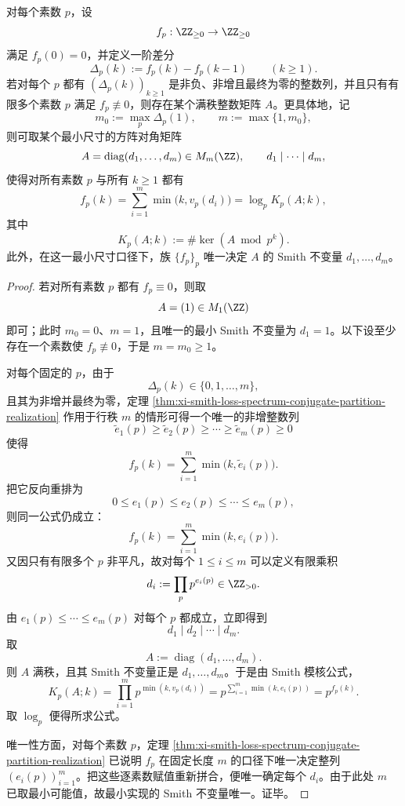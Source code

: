 \begin{theorem}\label{thm:xi-time-part62de-smith-profile-global-realization}
对每个素数 \(p\)，设
\[
f_p:\ZZ_{\ge 0}\to \ZZ_{\ge 0}
\]
满足 \(f_p(0)=0\)，并定义一阶差分
\[
\Delta_p(k):=f_p(k)-f_p(k-1)
\qquad (k\ge 1).
\]
若对每个 \(p\) 都有 \((\Delta_p(k))_{k\ge 1}\) 是非负、非增且最终为零的整数列，并且只有有限多个素数 \(p\) 满足 \(f_p\not\equiv 0\)，则存在某个满秩整数矩阵 \(A\)。更具体地，记
\[
m_0:=\max_{p}\Delta_p(1),
\qquad
m:=\max\{1,m_0\},
\]
则可取某个最小尺寸的方阵对角矩阵
\[
A=\operatorname{diag}(d_1,\dots,d_m)\in M_m(\ZZ),
\qquad
d_1\mid \cdots\mid d_m,
\]
使得对所有素数 \(p\) 与所有 \(k\ge 1\) 都有
\[
f_p(k)
=
\sum_{i=1}^{m}\min\bigl(k,v_p(d_i)\bigr)
=
\log_p K_p(A;k),
\]
其中
\[
K_p(A;k):=\#\ker(A\bmod p^k).
\]
此外，在这一最小尺寸口径下，族 \(\{f_p\}_p\) 唯一决定 \(A\) 的 Smith 不变量 \(d_1,\dots,d_m\)。
\end{theorem}
\begin{proof}
若对所有素数 \(p\) 都有 \(f_p\equiv 0\)，则取
\[
A=(1)\in M_1(\ZZ)
\]
即可；此时 \(m_0=0\)、\(m=1\)，且唯一的最小 Smith 不变量为 \(d_1=1\)。以下设至少存在一个素数使 \(f_p\not\equiv 0\)，于是 \(m=m_0\ge 1\)。

对每个固定的 \(p\)，由于
\[
\Delta_p(k)\in\{0,1,\dots,m\},
\]
且其为非增并最终为零，定理 \ref{thm:xi-smith-loss-spectrum-conjugate-partition-realization} 作用于行秩 \(m\) 的情形可得一个唯一的非增整数列
\[
\widetilde e_1(p)\ge \widetilde e_2(p)\ge \cdots \ge \widetilde e_m(p)\ge 0
\]
使得
\[
f_p(k)=\sum_{i=1}^{m}\min\bigl(k,\widetilde e_i(p)\bigr).
\]
把它反向重排为
\[
0\le e_1(p)\le e_2(p)\le \cdots \le e_m(p),
\]
则同一公式仍成立：
\[
f_p(k)=\sum_{i=1}^{m}\min\bigl(k,e_i(p)\bigr).
\]
又因只有有限多个 \(p\) 非平凡，故对每个 \(1\le i\le m\) 可以定义有限乘积
\[
d_i:=\prod_{p}p^{e_i(p)}\in \ZZ_{>0}.
\]
由 \(e_1(p)\le \cdots \le e_m(p)\) 对每个 \(p\) 都成立，立即得到
\[
d_1\mid d_2\mid \cdots \mid d_m.
\]
取
\[
A:=\operatorname{diag}(d_1,\dots,d_m).
\]
则 \(A\) 满秩，且其 Smith 不变量正是 \(d_1,\dots,d_m\)。于是由 Smith 模核公式，
\[
K_p(A;k)
=
\prod_{i=1}^{m}p^{\min(k,v_p(d_i))}
=
p^{\sum_{i=1}^{m}\min(k,e_i(p))}
=
p^{f_p(k)}.
\]
取 \(\log_p\) 便得所求公式。

唯一性方面，对每个素数 \(p\)，定理 \ref{thm:xi-smith-loss-spectrum-conjugate-partition-realization} 已说明 \(f_p\) 在固定长度 \(m\) 的口径下唯一决定整列 \((e_i(p))_{i=1}^{m}\)。把这些逐素数赋值重新拼合，便唯一确定每个 \(d_i\)。由于此处 \(m\) 已取最小可能值，故最小实现的 Smith 不变量唯一。证毕。
\end{proof}

